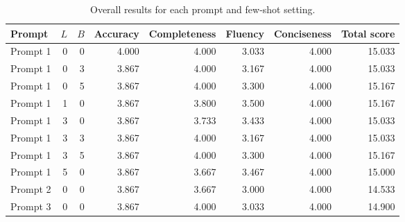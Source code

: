 \begin{table}
\caption{Overall results for each prompt and few-shot setting.}
\begin{tabular}{lrrrrrrr}
\toprule
Prompt & $L$ & $B$ & Accuracy & Completeness & Fluency & Conciseness & Total score \\
\midrule
Prompt 1 & 0 & 0 & 4.000 & 4.000 & 3.033 & 4.000 & 15.033 \\
Prompt 1 & 0 & 3 & 3.867 & 4.000 & 3.167 & 4.000 & 15.033 \\
Prompt 1 & 0 & 5 & 3.867 & 4.000 & 3.300 & 4.000 & 15.167 \\
Prompt 1 & 1 & 0 & 3.867 & 3.800 & 3.500 & 4.000 & 15.167 \\
Prompt 1 & 3 & 0 & 3.867 & 3.733 & 3.433 & 4.000 & 15.033 \\
Prompt 1 & 3 & 3 & 3.867 & 4.000 & 3.167 & 4.000 & 15.033 \\
Prompt 1 & 3 & 5 & 3.867 & 4.000 & 3.300 & 4.000 & 15.167 \\
Prompt 1 & 5 & 0 & 3.867 & 3.667 & 3.467 & 4.000 & 15.000 \\
Prompt 2 & 0 & 0 & 3.867 & 3.667 & 3.000 & 4.000 & 14.533 \\
Prompt 3 & 0 & 0 & 3.867 & 4.000 & 3.033 & 4.000 & 14.900 \\
\bottomrule
\end{tabular}
\end{table}
